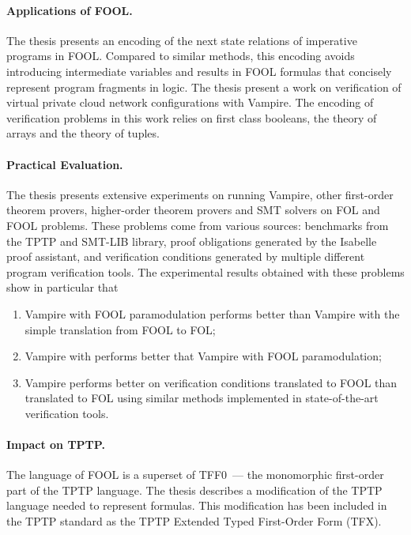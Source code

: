 \paragraph{Applications of FOOL.}
The thesis presents an encoding of the next state relations of imperative programs in FOOL. Compared to similar methods, this encoding avoids introducing intermediate variables and results in FOOL formulas that concisely represent program fragments in logic.
The thesis present a work on verification of virtual private cloud network configurations with Vampire. The encoding of verification problems in this work relies on first class booleans, the theory of arrays and the theory of tuples.

\paragraph{Practical Evaluation.}
The thesis presents extensive experiments on running Vampire, other first-order theorem provers, higher-order theorem provers and SMT solvers on FOL and FOOL problems. These problems come from various sources: benchmarks from the TPTP and SMT-LIB library, proof obligations generated by the Isabelle proof assistant, and verification conditions generated by multiple different program verification tools. The experimental results obtained with these problems show in particular that \begin{enumerate}
  \item Vampire with FOOL paramodulation performs better than Vampire with the simple translation from FOOL to FOL;
  \item Vampire with \nfcnf{} performs better that Vampire with FOOL paramodulation;
  \item Vampire performs better on verification conditions translated to FOOL than translated to FOL using similar methods implemented in state-of-the-art verification tools.
\end{enumerate}

\paragraph{Impact on TPTP.}
The language of FOOL is a superset of TFF0~--- the monomorphic first-order part of the TPTP language. The thesis describes a modification of the TPTP language needed to represent \folb{} formulas. This modification has been included in the TPTP standard as the TPTP Extended Typed First-Order Form (TFX).

